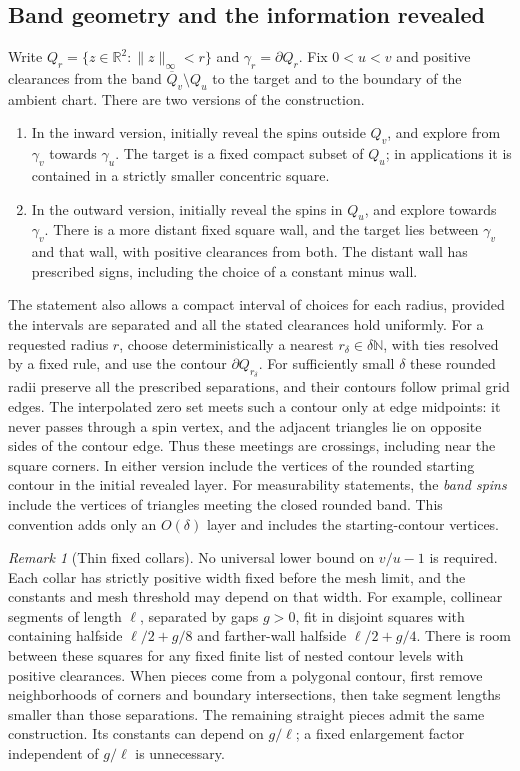 \documentclass[11pt]{article}
\theoremstyle{definition}
\theoremstyle{remark}
\newtheorem{remark}[theorem]{Remark}
\numberwithin{equation}{section}
\begin{document}
\subsection{Band geometry and the information revealed}

Write $Q_r=\{z\in\mathbb R^2:\|z\|_\infty<r\}$ and
$\gamma_r=\partial Q_r$.  Fix $0<u<v$ and positive clearances from the
band $\overline Q_v\setminus Q_u$ to the target and to the boundary of
the ambient chart.  There are two versions of the construction.
\begin{enumerate}
\item In the inward version, initially reveal the spins outside $Q_v$,
      and explore from $\gamma_v$ towards $\gamma_u$.  The target is a
      fixed compact subset of $Q_u$; in applications it is contained in
      a strictly smaller concentric square.
\item In the outward version, initially reveal the spins in $Q_u$,
      and explore towards $\gamma_v$.  There is a more distant fixed
      square wall, and the target lies between $\gamma_v$ and that wall,
      with positive clearances from both.  The distant wall has prescribed
      signs, including the choice of a constant minus wall.
\end{enumerate}
The statement also allows a compact interval of choices for each radius,
provided the intervals are separated and all the stated clearances hold
uniformly. For a requested radius $r$, choose deterministically a nearest
$r_\delta\in\delta\mathbb N$, with ties resolved by a fixed rule, and
use the contour $\partial Q_{r_\delta}$. For sufficiently small $\delta$
these rounded radii preserve all the prescribed separations, and their
contours follow primal grid edges. The
interpolated zero set meets such a contour only at edge midpoints:
it never passes through a spin vertex, and the adjacent triangles
lie on opposite sides of the contour edge.  Thus these meetings are
crossings, including near the square corners.
In either version include the vertices of the rounded starting contour
in the initial revealed layer.
For measurability statements, the \emph{band spins} include the vertices
of triangles meeting the closed rounded band. This convention adds only
an $O(\delta)$ layer and includes the starting-contour vertices.

\begin{remark}[Thin fixed collars]\label{if:thin-collars}
No universal lower bound on $v/u-1$ is required. Each collar has
strictly positive width fixed before the mesh limit, and the constants
and mesh threshold may depend on that width. For example, collinear
segments of length $\ell$, separated by gaps $g>0$, fit in disjoint
squares with containing halfside $\ell/2+g/8$ and farther-wall
halfside $\ell/2+g/4$. There is room between these squares for any
fixed finite list of nested contour levels with positive clearances.
When pieces come from a polygonal contour, first remove neighborhoods
of corners and boundary intersections, then take segment lengths
smaller than those separations. The remaining straight pieces admit
the same construction. Its constants can depend on $g/\ell$; a
fixed enlargement factor independent of $g/\ell$ is unnecessary.
\end{remark}
\end{document}
